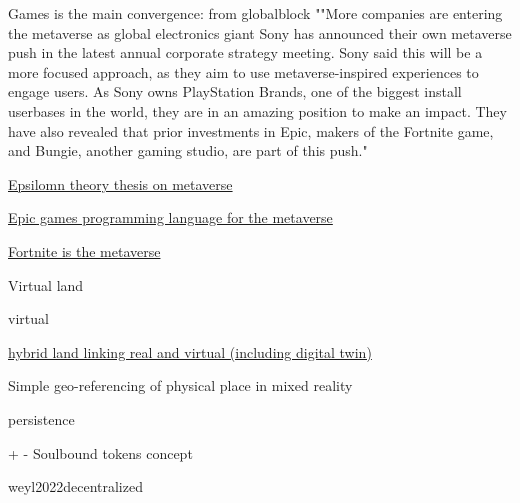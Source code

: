       Games is the main convergence: from globalblock ""More companies
      are entering the metaverse as global electronics giant Sony has
      announced their own metaverse push in the latest annual corporate
      strategy meeting. Sony said this will be a more focused approach,
      as they aim to use metaverse-inspired experiences to engage users.
      As Sony owns PlayStation Brands, one of the biggest install
      userbases in the world, they are in an amazing position to make an
      impact. They have also revealed that prior investments in Epic,
      makers of the Fortnite game, and Bungie, another gaming studio,
      are part of this push."

       
      \tightlist
       
       
     
      \href{https://www.epsilontheory.com/narrative-and-metaverse-pt-3-the-luther-protocol/\#.YjyHbnLIE5k.twitter}{Epsilomn
      theory thesis on metaverse}
     
      \href{https://www.geekmetaverse.com/epic-games-launches-verse-the-metaverse-programming-language/}{Epic
      games programming language for the metaverse}
     
      \href{https://www.ign.com/articles/how-fortnite-is-the-antidote-to-metaverse-skepticism}{Fortnite
      is the metaverse}
     
   
    Virtual land

     
    \tightlist
     
      virtual
     
      \href{https://labusinessjournal.com/featured/metahouse-could-be-first-of-many/}{hybrid
      land linking real and virtual (including digital twin)}
     
      Simple geo-referencing of physical place in mixed reality
     
   
    persistence

     
    \tightlist
     
      \protect\hypertarget{show1_2}{}{+}
      \protect\hypertarget{hide1_2}{}{-} Soulbound tokens concept

       
      \tightlist
       
        weyl2022decentralized
       
